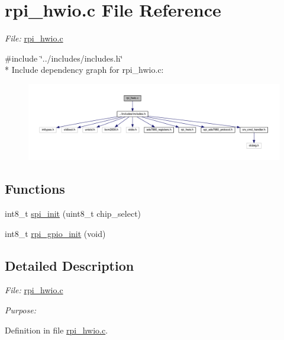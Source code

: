 \hypertarget{a00038}{\section{rpi\-\_\-hwio.\-c File Reference}
\label{d8/d41/a00038}
}


{\itshape File\-:} \hyperlink{a00038}{rpi\-\_\-hwio.\-c} \par
  


{\ttfamily \#include \char`\"{}../includes/includes.\-h\char`\"{}}\\*
Include dependency graph for rpi\-\_\-hwio.\-c\-:\nopagebreak
\begin{figure}[H]
\begin{center}
\leavevmode
\includegraphics[width=350pt]{d2/dee/a00049}
\end{center}
\end{figure}
\subsection*{Functions}
{\bf }\par
\begin{DoxyCompactItemize}
\item 
int8\-\_\-t \hyperlink{a00005_ga96ddfd5c89b80852982ba50dd18256f6}{spi\-\_\-init} (uint8\-\_\-t chip\-\_\-select)
\begin{DoxyCompactList}\small\item\em 

 \end{DoxyCompactList}\end{DoxyCompactItemize}

{\bf }\par
\begin{DoxyCompactItemize}
\item 
int8\-\_\-t \hyperlink{a00005_ga156b48448f55534a2f9c805a1f760efa}{rpi\-\_\-gpio\-\_\-init} (void)
\begin{DoxyCompactList}\small\item\em 

 \end{DoxyCompactList}\end{DoxyCompactItemize}



\subsection{Detailed Description}
{\itshape File\-:} \hyperlink{a00038}{rpi\-\_\-hwio.\-c} \par
 {\itshape Purpose\-:} \par
 

Definition in file \hyperlink{a00038_source}{rpi\-\_\-hwio.\-c}.

